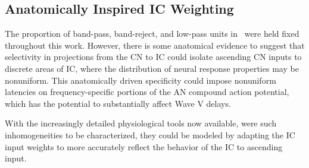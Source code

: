 \subsection{Anatomically Inspired IC Weighting} %
\label{sub:anatomically_inspired_brainstem_adaptation}
The proportion of band-pass, band-reject, and low-pass units in~\cite{Carney2015Speech} were held fixed throughout this work.  However, there is some anatomical evidence to suggest that selectivity in projections from the CN to IC could isolate ascending CN inputs to discrete areas of IC, where the distribution of neural response properties may be nonuniform.  This anatomically driven specificity could impose nonuniform latencies on frequency-specific portions of the AN compound action potential, which has the potential to substantially affect Wave V delays.

With the increasingly detailed physiological tools now available, were such inhomogeneities to be characterized, they could be modeled by adapting the IC input weights to more accurately reflect the behavior of the IC to ascending input. 
